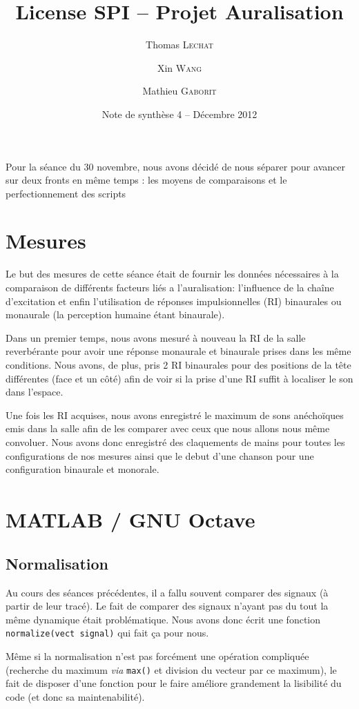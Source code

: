 \documentclass[12pt]{article}
\title{License SPI -- Projet Auralisation}
\author{Thomas \textsc{Lechat} \and Xin \textsc{Wang} \and Mathieu \textsc{Gaborit}}
\date{Note de synthèse 4 -- Décembre 2012}
\newcommand{\Octave}{GNU Octave }
\newcommand{\Matlab}{MATLAB\textsuperscript{\textregistered} }
\begin{document}
\maketitle

Pour la séance du 30 novembre, nous avons décidé de nous séparer pour avancer sur deux fronts en même temps : les moyens de comparaisons et le perfectionnement des scripts

\section{Mesures}%

Le but des mesures de cette séance était de fournir les données nécessaires à la comparaison de différents facteurs liés a l'auralisation: l'influence de la chaîne d'excitation et enfin l'utilisation de réponses impulsionnelles (RI) binaurales ou monaurale (la perception humaine étant binaurale).

Dans un premier temps, nous avons mesuré à nouveau la RI de la salle reverbérante pour avoir une réponse monaurale et binaurale prises dans les même conditions. Nous avons, de plus, pris 2 RI binaurales pour des positions de la tête différentes (face et un côté) afin de voir si la prise d'une RI suffit à localiser le son dans l'espace.

Une fois les RI acquises, nous avons enregistré le maximum de sons anéchoïques emis dans la salle afin de les comparer avec ceux que nous allons nous même convoluer. Nous avons donc enregistré des claquements de mains pour toutes les configurations de nos mesures ainsi que le debut d'une chanson pour une configuration binaurale et monorale.

\section{\Matlab / \Octave}%
\subsection{Normalisation} %

Au cours des séances précédentes, il a fallu souvent comparer des signaux (à partir de leur tracé).
Le fait de comparer des signaux n'ayant pas du tout la même dynamique était problématique.
Nous avons donc écrit une fonction \texttt{normalize(vect signal)} qui fait ça pour nous.

Même si la normalisation n'est pas forcément une opération compliquée (recherche du maximum \textit{via} \texttt{max()}
et division du vecteur par ce maximum), le fait de disposer d'une fonction pour le faire améliore grandement la
lisibilité du code (et donc sa maintenabilité).
\end{document}
